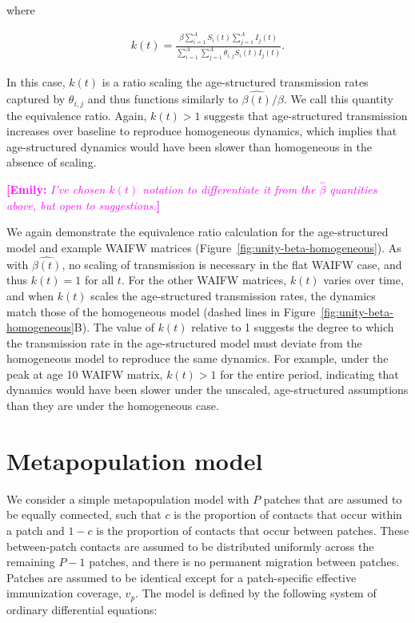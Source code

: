 \documentclass[12pt]{article}
\newcommand{\commentmacro}[3]{\textcolor{#1}{\textbf{[#2: }\textsl{#3}\textbf{]}}}
\newcommand{\emily}[1]{\commentmacro{magenta}{Emily}{#1}}
\begin{document}
\noindent
where 

\begin{align}
    k(t) = \frac{\beta \sum_{i=1}^{A} S_i(t) \sum_{j=1}^{A} I_j(t)}{\sum_{i=1}^{A}\sum_{j=1}^{A} \theta_{i,j} S_i(t) I_j(t)}.
    \label{eq:unity-beta-homogeneous}
\end{align}

\noindent
In this case, $k(t)$ is a ratio scaling the age-structured transmission rates captured by $\theta_{i,j}$ and thus functions similarly to $\hat{\beta(t)}/ \beta$. We call this quantity the equivalence ratio. Again, $k(t) > 1$ suggests that age-structured transmission increases over baseline to reproduce homogeneous dynamics, which implies that age-structured dynamics would have been slower than homogeneous in the absence of scaling. 

\emily{I've chosen $k(t)$ notation to differentiate it from the $\hat{\beta}$ quantities above, but open to suggestions.}

We again demonstrate the equivalence ratio calculation for the age-structured model and example WAIFW matrices (Figure~\ref{fig:unity-beta-homogeneous}). As with $\hat{\beta(t)}$, no scaling of transmission is necessary in the flat WAIFW case, and thus $k(t) = 1$ for all $t$. For the other WAIFW matrices, $k(t)$ varies over time, and when $k(t)$ scales the age-structured transmission rates, the dynamics match those of the homogeneous model (dashed lines in Figure~\ref{fig:unity-beta-homogeneous}B). The value of $k(t)$ relative to 1 suggests the degree to which the transmission rate in the age-structured model must deviate from the homogeneous model to reproduce the same dynamics. For example, under the peak at age 10 WAIFW matrix, $k(t) > 1$ for the entire period, indicating that dynamics would have been slower under the unscaled, age-structured assumptions than they are under the homogeneous case.


\section{Metapopulation model}
\label{sec:metapopulation}

We consider a simple metapopulation model with $P$ patches that are assumed to be equally connected, such that $c$ is the proportion of contacts that occur within a patch and $1-c$ is the proportion of contacts that occur between patches. These between-patch contacts are assumed to be distributed uniformly across the remaining $P-1$ patches, and there is no permanent migration between patches. Patches are assumed to be identical except for a patch-specific effective immunization coverage, $v_p$. The model is defined by the following system of ordinary differential equations:
\end{document}
